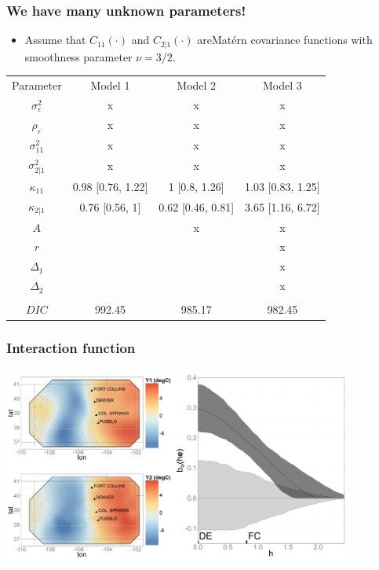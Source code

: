 \documentclass{beamer}
\begin{document}
\begin{frame}
\frametitle{We have many unknown parameters!}

\begin{itemize}
\item Assume that $C_{11}(\cdot)$ and $C_{2|1}(\cdot)$ areMat{\'e}rn covariance functions with smoothness parameter $\nu = 3/2$.
\end{itemize}
\small
\begin{center}
\begin{tabular} {cccc}
  { Parameter} 	& {Model 1} 	& {Model 2} & {Model 3} 			 \\ 
  $\sigma_\varepsilon^2$&  x & x & x \\
  $\rho_\varepsilon$&  x & x & x \\
  $\sigma^2_{11}$& x & x & x \\
  $\sigma^2_{2|1}$& x & x & x \\
  $\kappa_{11}$&0.98 [0.76, 1.22]&1 [0.8, 1.26]&1.03 [0.83, 1.25]\\
  $\kappa_{2|1}$&0.76 [0.56, 1]&0.62 [0.46, 0.81]&3.65 [1.16, 6.72]\\
  $A$&& x & x \\
  $r$&&& x \\
  $\Delta_1$&&& x\\
  $\Delta_2$&&& x \\
  &&&\\
  $DIC$&992.45&985.17&982.45
\end{tabular}
\end{center}
\normalsize
\end{frame}


\begin{frame}
\frametitle{Interaction function}

\includegraphics[width=4.5in]{Fig3.pdf}

\end{frame}
\end{document}
